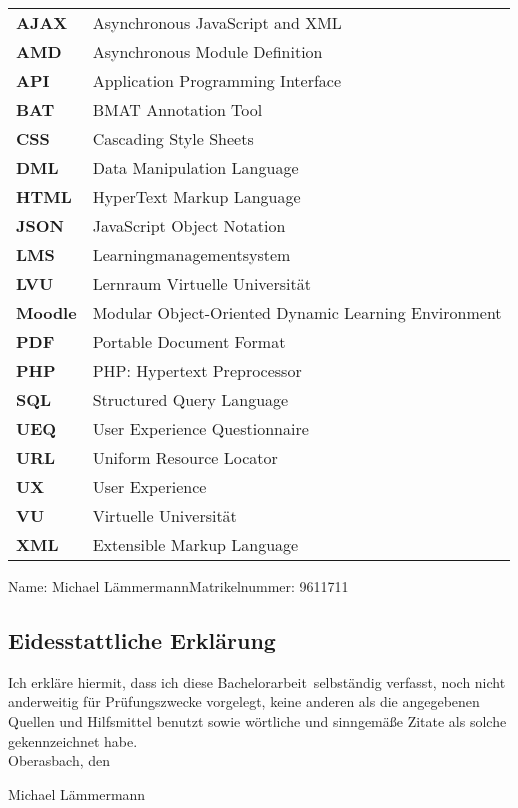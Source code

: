 \documentclass[twoside,bibliography=totoc,openany,numbers=noenddot]{fumi}
\newcommand{\thesisauthor}{Michael Lämmermann}
\newcommand{\thesistype}{Bachelorarbeit} %
\newcommand{\thesismatrikelnummer}{9611711}
\begin{document}
\renewcommand*{\arraystretch}{1.4}
\setlength{\LTleft}{0pt}
\begin{longtable}[l]{p{2cm}p{15cm}}
\textbf{AJAX} & Asynchronous JavaScript and XML \\
\textbf{AMD} & Asynchronous Module Definition \\
\textbf{API} & Application Programming Interface \\
\textbf{BAT} & BMAT Annotation Tool \\
\textbf{CSS} & Cascading Style Sheets \\
\textbf{DML} & Data Manipulation Language \\
\textbf{HTML} & HyperText Markup Language \\
\textbf{JSON} & JavaScript Object Notation \\
\textbf{LMS} & Learningmanagementsystem \\
\textbf{LVU} & Lernraum Virtuelle Universität \\
\textbf{Moodle} & Modular Object-Oriented Dynamic Learning Environment \\
\textbf{PDF} & Portable Document Format \\
\textbf{PHP} & PHP: Hypertext Preprocessor \\
\textbf{SQL} & Structured Query Language \\
\textbf{UEQ} & User Experience Questionnaire \\
\textbf{URL} & Uniform Resource Locator \\
\textbf{UX} & User Experience \\
\textbf{VU} & Virtuelle Universität \\
\textbf{XML} & Extensible Markup Language \\
\end{longtable}
\cleardoublepage


Name: \thesisauthor \hfill Matrikelnummer: \thesismatrikelnummer \vspace{2cm}
\subsection*{Eidesstattliche Erklärung}
Ich erkläre hiermit, dass ich diese \thesistype~selbständig verfasst, noch nicht anderweitig für Prüfungszwecke vorgelegt, keine anderen als die angegebenen Quellen und Hilfsmittel benutzt sowie wörtliche und sinngemäße Zitate als solche gekennzeichnet habe.\\[1cm]
Oberasbach, den \dotfill

\hspace{3,5cm}{\footnotesize Datum}\hspace{5cm} {\footnotesize \thesisauthor}
\end{document}
